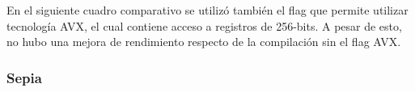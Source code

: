 \documentclass[a4paper]{article}
\begin{document}
En el siguiente cuadro comparativo se utilizó también el flag que permite utilizar tecnología AVX, el cual contiene acceso
a registros de 256-bits. A pesar de esto, no hubo una mejora de rendimiento respecto de la compilación sin el flag AVX.
\begin{figure}[!ht]
    \centering
    \begin{floatrow}
    \end{floatrow}
\end{figure}


\subsubsection{Sepia}
\end{document}
